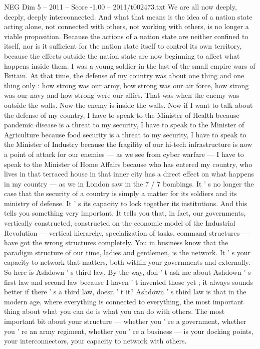 \begin{textsample}{NEG Dim 5 – 2011 – Score -1.00 – 2011/t002473.txt}
We are all now deeply, deeply, deeply interconnected.
And what that means is the idea of a nation state acting alone, not connected with others, not working with others, is no longer a viable proposition.
Because the actions of a nation state are neither confined to itself, nor is it sufficient for the nation state itself to control its own territory, because the effects outside the nation state are now beginning to affect what happens inside them.
I was a young soldier in the last of the small empire wars of Britain.
At that time, the defense of my country was about one thing and one thing only : how strong was our army, how strong was our air force, how strong was our navy and how strong were our allies.
That was when the enemy was outside the walls.
Now the enemy is inside the walls.
Now if I want to talk about the defense of my country, I have to speak to the Minister of Health because pandemic disease is a threat to my security, I have to speak to the Minister of Agriculture because food security is a threat to my security, I have to speak to the Minister of Industry because the fragility of our hi-tech infrastructure is now a point of attack for our enemies — as we see from cyber warfare — I have to speak to the Minister of Home Affairs because who has entered my country, who lives in that terraced house in that inner city has a direct effect on what happens in my country — as we in London saw in the 7 / 7 bombings.
It ' s no longer the case that the security of a country is simply a matter for its soldiers and its ministry of defense.
It ' s its capacity to lock together its institutions.
And this tells you something very important.
It tells you that, in fact, our governments, vertically constructed, constructed on the economic model of the Industrial Revolution — vertical hierarchy, specialization of tasks, command structures — have got the wrong structures completely.
You in business know that the paradigm structure of our time, ladies and gentlemen, is the network.
It ' s your capacity to network that matters, both within your governments and externally.
So here is Ashdown ' s third law.
By the way, don ' t ask me about Ashdown ' s first law and second law because I haven ' t invented those yet ; it always sounds better if there ' s a third law, doesn ' t it?
Ashdown ' s third law is that in the modern age, where everything is connected to everything, the most important thing about what you can do is what you can do with others.
The most important bit about your structure — whether you ' re a government, whether you ' re an army regiment, whether you ' re a business — is your docking points, your interconnectors, your capacity to network with others.

\end{textsample}
